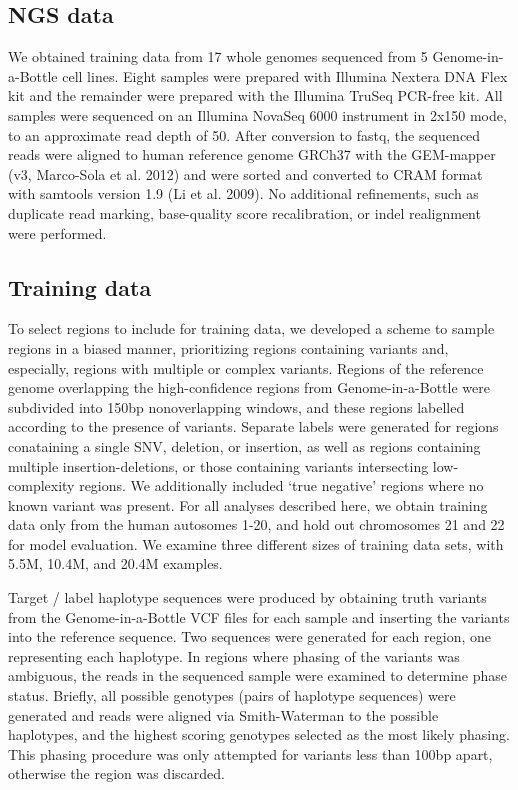 \documentclass[]{article}
\begin{document}
\subsection{NGS data}

We obtained training data from 17 whole genomes sequenced from 5 Genome-in-a-Bottle cell lines. Eight samples were prepared with Illumina Nextera DNA Flex kit and the remainder were prepared with the Illumina TruSeq PCR-free kit. All samples were sequenced on an Illumina NovaSeq 6000 instrument in 2x150 mode, to an approximate read depth of 50. After conversion to fastq, the sequenced reads were aligned to human reference genome GRCh37 with the GEM-mapper (v3, Marco-Sola et al. 2012) and were sorted and converted to CRAM format with samtools version 1.9 (Li et al. 2009). No additional refinements, such as duplicate read marking, base-quality score recalibration, or indel realignment were performed.

\subsection{Training data}


To select regions to include for training data, we developed a scheme to sample regions in a biased manner, prioritizing regions containing variants and, especially, regions with multiple or complex variants. Regions of the reference genome overlapping the high-confidence regions from Genome-in-a-Bottle were subdivided into 150bp nonoverlapping windows, and these regions labelled according to the presence of variants. Separate labels were generated for regions conataining a single SNV, deletion, or insertion, as well as regions containing multiple insertion-deletions, or those containing variants intersecting low-complexity regions. We additionally included `true negative' regions where no known variant was present.  For all analyses described here, we obtain training data only from the human autosomes 1-20, and hold out chromosomes 21 and 22 for model evaluation.  We examine three different sizes of training data sets, with 5.5M, 10.4M, and 20.4M examples. 


Target / label haplotype sequences were produced by obtaining truth variants from the Genome-in-a-Bottle VCF files for each sample and inserting the variants into the reference sequence. Two sequences were generated for each region, one representing each haplotype. In regions where phasing of the variants was ambiguous, the reads in the sequenced sample were examined to determine phase status. Briefly, all possible genotypes (pairs of haplotype sequences) were generated and reads were aligned via Smith-Waterman to the possible haplotypes, and the highest scoring genotypes selected as the most likely phasing. This phasing procedure was only attempted for variants less than 100bp apart, otherwise the region was discarded.
\end{document}
